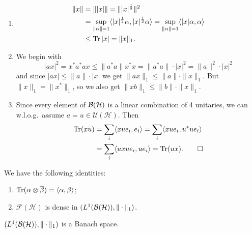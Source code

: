 \begin{myproof}
  \begin{enumerate}
    \item
    \begin{align*}
      \| x\| &= \| |x|\| = \| |x|^{\frac{1}{2}} \|^2\\
      &= \sup _{\| \alpha\| = 1} \langle |x|^{\frac{1}{2}} \alpha, |x|^{\frac{1}{2}} \alpha \rangle = \sup_{\| \alpha \| = 1} \langle |x| \alpha, \alpha \rangle \\
      &\leq \operatorname{Tr} |x| = \| x\|_1.
    \end{align*}
    \item We begin with 
    \begin{equation*}
      | a x |^2 = x^* a ^* a  x \leq \| a ^* a \| x^* x = \| a^* a\|\cdot |x|^2 = \|a\|^2\cdot |x|^2
    \end{equation*}
    and since $|ax| \leq \| a\| \cdot |x|$ we get $\| ax\|_1 \leq \|a\| \cdot \|x\|_1$.
    But $\|x\|_1 = \|x^*\|_1$, so we also get $\| xb\|_1 \leq \|b\| \cdot \|x\|_1$.
    \item Since every element of $\operatorname{\mathcal{B} (\mathcal{H})}$ is a linear combination of 4 unitaries, we can w.l.o.g.~assume $a = u \in \mathcal{U} (\mathcal{H})$. Then 
    \begin{align*}
      \operatorname{Tr} (xu) &= \sum_i \langle x u e_i, e_i \rangle = \sum_i \langle x u e_i, u^* u e_i\rangle\\
      &= \sum_i \langle ux ue_i, u e_i \rangle = \operatorname{Tr} (ux). \qedhere
    \end{align*}
  \end{enumerate}
\end{myproof}

\begin{remark}
  We have the following identities:
  \begin{enumerate}
    \item $\operatorname{Tr} (\alpha \otimes \overline{\beta}) = \langle \alpha, \beta \rangle$;
    \item $\mathcal{F} (\mathcal{H})$ is dense in $(L^1 (\operatorname{\mathcal{B} (\mathcal{H})}), \| \cdot \|_1)$.
  \end{enumerate}
\end{remark}

\begin{theorem}
  $(L^1 (\operatorname{\mathcal{B} (\mathcal{H})}), \| \cdot \|_1)$ is a Banach space.
\end{theorem}

